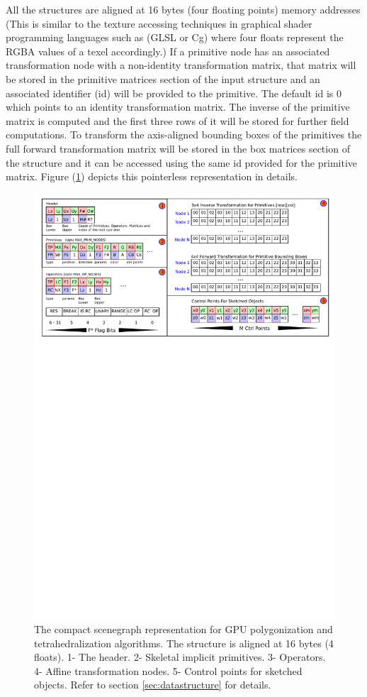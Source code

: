 All the structures are aligned at 16 bytes (four floating points) memory addresses (This is similar to the texture 
accessing techniques in graphical shader programming languages such as (GLSL or Cg) where four floats represent the 
RGBA values of a texel accordingly.) If a primitive node has an associated transformation node with a non-identity 
transformation matrix, that matrix will be stored in the primitive matrices section of the input structure and an 
associated identifier (id) will be provided to the primitive. The default id is 0 which points to an identity transformation 
matrix. The inverse of the primitive matrix is computed and the first three rows of it will be stored for further field 
computations. To transform the axis-aligned bounding boxes of the primitives the full forward transformation matrix will 
be stored in the box matrices section of the structure and it can be accessed using the same id provided for the primitive matrix.
Figure (\ref{fig:datastructure}) depicts this pointerless representation in details.

\begin{figure}[H]
  \centering
  \includegraphics[width=1.0\linewidth]{figures/gpupoly/lineartree.pdf}
  \caption{\label{fig:datastructure}
  {The compact \blob scenegraph representation for GPU polygonization and tetrahedralization algorithms. The structure is 
  aligned at 16 bytes (4 floats). 1- The header. 2- Skeletal implicit primitives. 3- Operators. 4- Affine transformation 
  nodes. 5- Control points for sketched objects. Refer to section \ref{sec:datastructure} for details.}
}
\end{figure}

